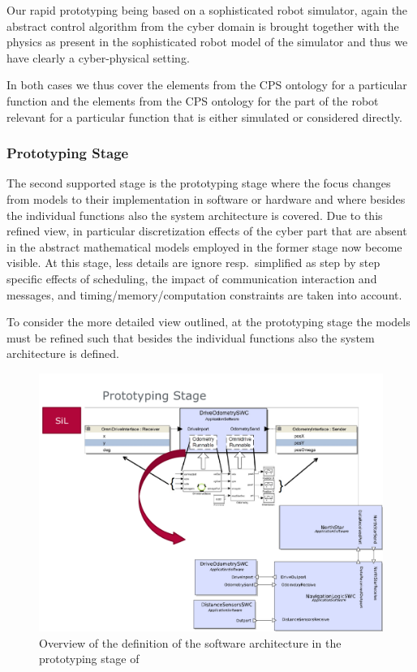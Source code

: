 Our rapid prototyping being based on a sophisticated robot simulator, again the abstract control algorithm from the cyber domain is brought together with the physics as present in the sophisticated robot model of the simulator and thus we have clearly a cyber-physical setting. 

In both cases we thus cover the elements \CPSCyberPart from the CPS ontology for a particular function and the elements \CPSPhysicalPart from the CPS ontology for the part of the robot relevant for a particular function that is either simulated or considered directly.






\subsubsection{Prototyping Stage}
%
The second supported stage is the prototyping stage where the focus changes from models to their implementation in software or hardware and where besides the individual functions also the system architecture is covered. Due to this refined view, in particular discretization effects of the cyber part that are absent in the abstract mathematical models employed in the former stage now become visible.
%
At this stage, less details are ignore resp.~simplified as step by step specific effects of scheduling, the impact of communication interaction and messages, and timing/memory/computation constraints are taken into account.


%
To consider the more detailed view outlined, at the prototyping stage the models must be refined such that besides the individual functions also the system architecture is defined.

\begin{figure}[!htb]
\centering
\includegraphics[scale=0.33]{figures/arch.pdf}
\caption{Overview of the definition of the software architecture in the prototyping stage of \cite{Broekman&Notenboom2003}}
\label{fig:arch}
\end{figure}

